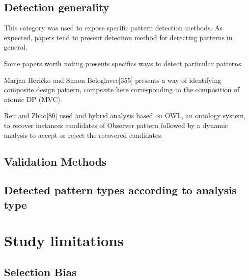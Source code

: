\documentclass[letterpaper, 10 pt, conference]{ieeeconf}  %
\begin{document}


\subsection{Detection generality}

This category was used to expose specific pattern detection methods.
As expected, papers tend to present detection method for detecting patterns
in general.

Some papers worth noting presents specifics ways to detect particular patterns.

Marjan Heričko and Simon Beloglavec[355] presents a way of identifying
composite design pattern, composite here corresponding to the composition of
atomic DP (MVC).

Ren and Zhao[80] used and hybrid analysis based on OWL, an ontology system,
to recover instances candidates of Observer pattern followed by a dynamic
analysis to accept or reject the recovered candidates.




\subsection{Validation Methods}



\subsection{Detected pattern types according to analysis type}



\section{Study limitations}

\subsection{Selection Bias}
\end{document}
